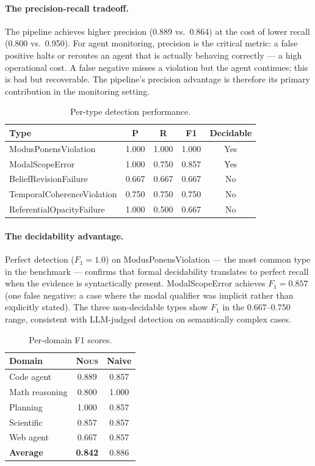 \documentclass[11pt]{article}
\newcommand{\nous}{\textsc{Nous}} %
\begin{document}
\paragraph{The precision-recall tradeoff.}
The pipeline achieves higher precision (0.889 vs.\ 0.864) at the cost of
lower recall (0.800 vs.\ 0.950). For agent monitoring, precision is the
critical metric: a false positive halts or reroutes an agent that is
actually behaving correctly — a high operational cost. A false negative
misses a violation but the agent continues; this is bad but recoverable.
The pipeline's precision advantage is therefore its primary contribution
in the monitoring setting.

\begin{table}[h]
\centering
\caption{Per-type detection performance.}
\label{tab:pertype}
\begin{tabular}{@{}lcccc@{}}
\toprule
\textbf{Type} & \textbf{P} & \textbf{R} & \textbf{F1} & \textbf{Decidable} \\
\midrule
ModusPonensViolation       & 1.000 & 1.000 & 1.000 & Yes \\
ModalScopeError            & 1.000 & 0.750 & 0.857 & Yes \\
BeliefRevisionFailure      & 0.667 & 0.667 & 0.667 & No  \\
TemporalCoherenceViolation & 0.750 & 0.750 & 0.750 & No  \\
ReferentialOpacityFailure  & 1.000 & 0.500 & 0.667 & No  \\
\bottomrule
\end{tabular}
\end{table}

\paragraph{The decidability advantage.}
Perfect detection ($F_1 = 1.0$) on ModusPonensViolation — the most common
type in the benchmark — confirms that formal decidability translates to
perfect recall when the evidence is syntactically present. ModalScopeError
achieves $F_1 = 0.857$ (one false negative: a case where the modal qualifier
was implicit rather than explicitly stated). The three non-decidable types
show $F_1$ in the $0.667$--$0.750$ range, consistent with LLM-judged
detection on semantically complex cases.

\begin{table}[h]
\centering
\caption{Per-domain F1 scores.}
\label{tab:perdomain}
\begin{tabular}{@{}lcc@{}}
\toprule
\textbf{Domain} & \textbf{\nous{}} & \textbf{Naive} \\
\midrule
Code agent       & 0.889 & 0.857 \\
Math reasoning   & 0.800 & 1.000 \\
Planning         & 1.000 & 0.857 \\
Scientific       & 0.857 & 0.857 \\
Web agent        & 0.667 & 0.857 \\
\midrule
\textbf{Average} & \textbf{0.842} & 0.886 \\
\bottomrule
\end{tabular}
\end{table}
\end{document}
